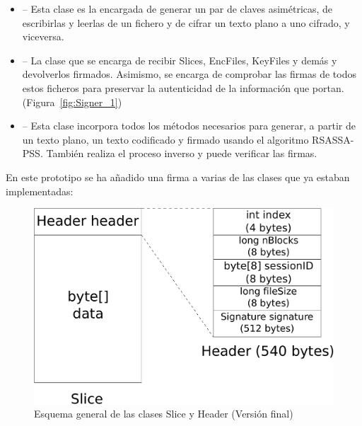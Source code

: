 \begin{itemize}
  \item {} -- Esta clase es la encargada de generar un par de
  claves asimétricas, de escribirlas y leerlas de un fichero y de cifrar
  un texto plano a uno cifrado, y viceversa.

  \item {} -- La clase que se encarga de recibir Slices, EncFiles,
  KeyFiles y demás y devolverlos firmados. Asimismo, se encarga de comprobar
  las firmas de todos estos ficheros para preservar la autenticidad de la
  información que portan. (Figura~\ref{fig:Signer_1})

  \item {} -- Esta clase incorpora todos los métodos necesarios
  para generar, a partir de un texto plano, un texto codificado y firmado
  usando el algoritmo RSASSA-PSS. También realiza el proceso inverso y puede
  verificar las firmas.
\end{itemize}



En este prototipo se ha añadido una firma a varias de las clases que ya estaban
implementadas:

\begin{figure}[!htb]
  \centering
  \includegraphics[scale=0.4]{Figures/Slice_Header_2}
  \decoRule
  \caption[Slice - Header (Versión final)]{Esquema general de las clases Slice y Header (Versión final)}
  \label{fig:Slice_Header_2}
\end{figure}

